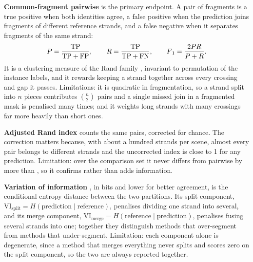 \begin{table}[tbp]
    \centering
    \caption{Sensitivity to the scorer's constants. Stored predictions were
    re-scored under one-at-a-time perturbations of the four common-fragment
    constants; $\Delta$ columns are paired mean margins, PLECTA minus
    comparator, over the scenes completed by both methods. The published
    constants were not changed in response.}
    \label{tab:scorer-sensitivity}
    
\end{table}

\textbf{Common-fragment pairwise \Fone{}} is the primary endpoint. A pair of
fragments is a true positive when both identities agree, a false positive when
the prediction joins fragments of different reference strands, and a false
negative when it separates fragments of the same strand:
\begin{equation}
    P=\frac{\mathrm{TP}}{\mathrm{TP}+\mathrm{FP}},\qquad
    R=\frac{\mathrm{TP}}{\mathrm{TP}+\mathrm{FN}},\qquad
    F\textsubscript{1}{}=\frac{2PR}{P+R}.
    \label{eq:pairwise-f1}
\end{equation}
It is a clustering measure of the Rand family
\citep{rand1971objective,amigo2009comparison,argandacarreras2015crowdsourcing},
invariant to permutation of the instance labels, and it rewards keeping a
strand together across every crossing and gap it passes. Limitations: it is
quadratic in fragmentation, so a strand split into $n$ pieces contributes
$\binom{n}{2}$ pairs and a single missed join in a fragmented mask is
penalised many times; and it weights long strands with many crossings far
more heavily than short ones.

\textbf{Adjusted Rand index} \citep{hubert1985comparing} counts the same pairs,
corrected for chance. The correction matters because, with about a hundred
strands per scene, almost every pair belongs to different strands and the
uncorrected index is close to 1 for any prediction. Limitation: over the
comparison set it never differs from pairwise \Fone{} by more than
\PlectaPanelARIMaxGap{}, so it confirms rather than adds information.

\textbf{Variation of information} \citep{meila2007comparing}, in bits and lower
for better agreement, is the conditional-entropy distance between the two
partitions. Its split component,
$\mathrm{VI}_{\mathrm{split}}=H(\text{prediction}\mid\text{reference})$,
penalises dividing one strand into several, and its merge component,
$\mathrm{VI}_{\mathrm{merge}}=H(\text{reference}\mid\text{prediction})$,
penalises fusing several strands into one; together they distinguish methods
that over-segment from methods that under-segment. Limitation: each component
alone is degenerate, since a method that merges everything never splits and
scores zero on the split component, so the two are always reported together.

